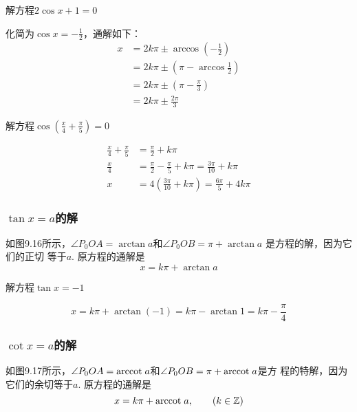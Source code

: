 \begin{example}
    解方程$2\cos x+1=0$
\end{example}

\begin{solution}
    化简为$\cos x=-\frac{1}{2}$，通解如下：
\[\begin{split}
    x&=2k\pi\pm\arccos\left(-\frac{1}{2}\right)\\
    &=2k\pi\pm \left(\pi-\arccos\frac{1}{2}\right)\\
    &=2k\pi\pm \left(\pi-\frac{\pi}{3}\right)\\
    &=2k\pi\pm \frac{2\pi}{3}
\end{split}\]
\end{solution}


\begin{example}
    解方程$\cos\left(\frac{x}{4}+\frac{\pi}{5}\right)=0$
\end{example}

\begin{solution}
    \[\begin{split}
        \frac{x}{4}+\frac{\pi}{5}&=\frac{\pi}{2}+k\pi\\
        \frac{x}{4}&=\frac{\pi}{2}-\frac{\pi}{5}+k\pi=\frac{3\pi}{10}+k\pi\\
        x&=4\left(\frac{3\pi}{10}+k\pi\right)=\frac{6\pi}{5}+4k\pi
    \end{split}
    \]
\end{solution}

\subsubsection{$\tan x=a$的解}

如图9.16所示，$\angle P_0OA=\arctan a$和$\angle P_0OB=\pi+\arctan a$
是方程的解，因为它们的正切
等于$a$. 原方程的通解是
\[x=k\pi+\arctan a\]


\begin{example}
    解方程$\tan x=-1$    
\end{example}

\begin{solution}
\[x=k\pi+\arctan(-1)=k\pi-\arctan1=k\pi-\frac{\pi}{4}\]
\end{solution}

\subsubsection{$\cot x=a$的解}

如图9.17所示，$\angle P_0OA={\rm arccot\; } a$和$\angle P_0OB=\pi+{\rm arccot\; } a$是方
程的特解，因为它们的余切等于$a$. 原方程的通解是
\[x=k\pi+{\rm arccot\; } a,\qquad (k\in\mathbb{Z})\]

